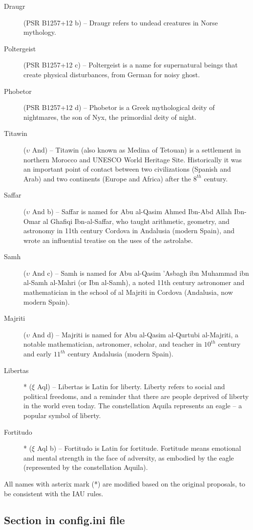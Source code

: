 \begin{description}
\item[Draugr] (PSR B1257+12 b) -- Draugr refers to undead creatures in Norse mythology.
\item[Poltergeist] (PSR B1257+12 c) -- Poltergeist is a name for supernatural beings that create physical disturbances, from German for noisy ghost.
\item[Phobetor] (PSR B1257+12 d) -- Phobetor is a Greek mythological deity of nightmares, the son of Nyx, the primordial deity of night.
\item[Titawin] ($\upsilon$ And) -- Titawin (also known as Medina of Tetouan) is a settlement in northern Morocco and UNESCO World Heritage Site. Historically it was an important point of contact between two civilizations (Spanish and Arab) and two continents (Europe and Africa) after the $8^{th}$ century.
\item[Saffar] ($\upsilon$ And b) -- Saffar is named for Abu al-Qasim Ahmed Ibn-Abd Allah Ibn-Omar al Ghafiqi Ibn-al-Saffar, who taught arithmetic, geometry, and astronomy in 11th century Cordova in Andalusia (modern Spain), and wrote an influential treatise on the uses of the astrolabe.
\item[Samh] ($\upsilon$ And c) -- Samh is named for Abu al-Qasim 'Asbagh ibn Muhammad ibn al-Samh al-Mahri (or Ibn al-Samh), a noted 11th century astronomer and mathematician in the school of al Majriti in Cordova (Andalusia, now modern Spain).
\item[Majriti] ($\upsilon$ And d) -- Majriti is named for Abu al-Qasim al-Qurtubi al-Majriti, a notable mathematician, astronomer, scholar, and teacher in $10^{th}$ century and early $11^{th}$ century Andalusia (modern Spain).
\item[Libertas]* ($\xi$ Aql) -- Libertas is Latin for liberty. Liberty refers to social and political freedoms, and a reminder that there are people deprived of liberty in the world even today. The constellation Aquila represents an eagle -- a popular symbol of liberty.
\item[Fortitudo]* ($\xi$ Aql b) -- Fortitudo is Latin for fortitude. Fortitude means emotional and mental strength in the face of adversity, as embodied by the eagle (represented by the constellation Aquila).
\end{description}

All names with asterix mark (*) are modified based on the original proposals, to be consistent with the IAU rules.


\subsection{Section  in config.ini file}
\label{sec:plugins:Exoplanets:config}

